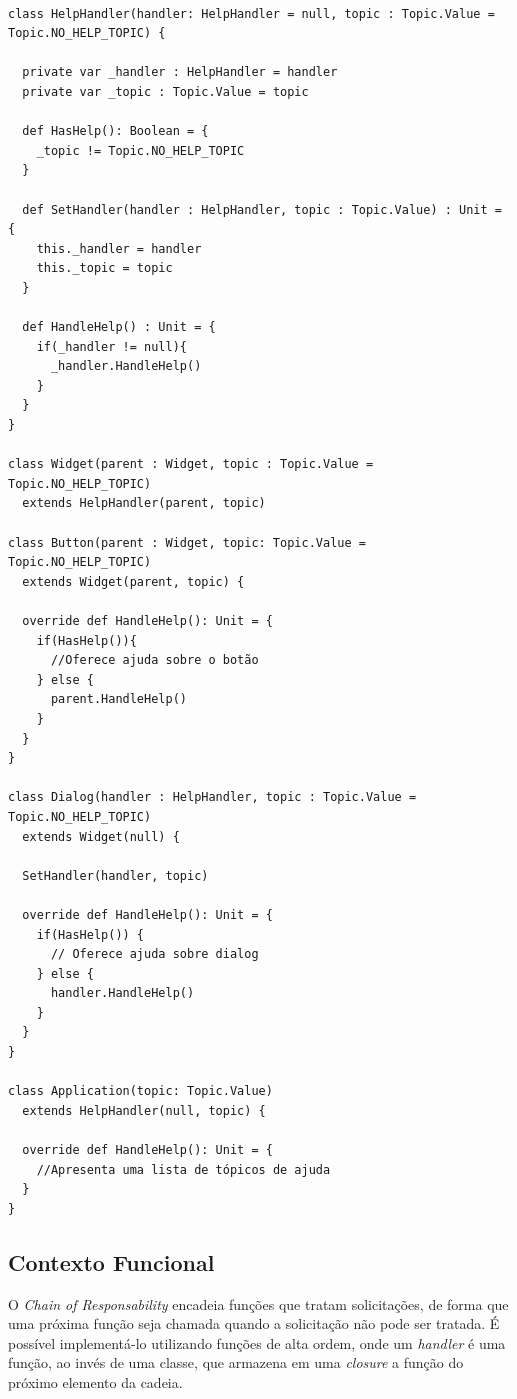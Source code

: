 \begin{lstlisting}[caption={\textit{Chain of Responsibility} Orientação a Objetos.},label=oochresponsibility]

class HelpHandler(handler: HelpHandler = null, topic : Topic.Value = Topic.NO_HELP_TOPIC) {

  private var _handler : HelpHandler = handler
  private var _topic : Topic.Value = topic

  def HasHelp(): Boolean = {
    _topic != Topic.NO_HELP_TOPIC
  }

  def SetHandler(handler : HelpHandler, topic : Topic.Value) : Unit = {
    this._handler = handler
    this._topic = topic
  }

  def HandleHelp() : Unit = {
    if(_handler != null){
      _handler.HandleHelp()
    }
  }
}

class Widget(parent : Widget, topic : Topic.Value = Topic.NO_HELP_TOPIC)
  extends HelpHandler(parent, topic)
  
class Button(parent : Widget, topic: Topic.Value = Topic.NO_HELP_TOPIC)
  extends Widget(parent, topic) {

  override def HandleHelp(): Unit = {
    if(HasHelp()){
      //Oferece ajuda sobre o botão
    } else {
      parent.HandleHelp()
    }
  }
}

class Dialog(handler : HelpHandler, topic : Topic.Value = Topic.NO_HELP_TOPIC)
  extends Widget(null) {

  SetHandler(handler, topic)

  override def HandleHelp(): Unit = {
    if(HasHelp()) {
      // Oferece ajuda sobre dialog
    } else {
      handler.HandleHelp()
    }
  }
}

class Application(topic: Topic.Value)
  extends HelpHandler(null, topic) {

  override def HandleHelp(): Unit = {
    //Apresenta uma lista de tópicos de ajuda
  }
}

\end{lstlisting}

\subsection*{Contexto Funcional}

O \textit{Chain of Responsability} encadeia funções que 
tratam solicitações, de forma que uma próxima 
função seja chamada quando a solicitação não 
pode ser tratada. É possível implementá-lo 
utilizando funções de alta ordem, onde um 
\textit{handler} é uma função, ao invés de 
uma classe, que armazena em uma \textit{closure} 
a função do próximo elemento da cadeia. 

